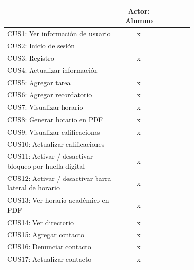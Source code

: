 \documentclass[10pt]{article}
\begin{document}
\begin{table}[ht]
    \begin{center}
        \begin{tabular}{|p{0.6\linewidth}|c |p{0.15\linewidth}|}
            \hline                                                   & Actor: Alumno \\ \hline
            {CUS1: Ver información de usuario}                       & x             \\ \hline
            {CUS2: Inicio de sesión}                                 &               \\ \hline
            {CUS3: Registro}                                         & x             \\ \hline
            {CUS4: Actualizar información}                           &               \\ \hline
            {CUS5: Agregar tarea}                                    & x             \\ \hline
            {CUS6: Agregar recordatorio}                             & x             \\ \hline
            {CUS7: Visualizar horario}                               & x             \\ \hline
            {CUS8: Generar horario en PDF}                           & x             \\ \hline
            {CUS9: Visualizar calificaciones}                        & x             \\ \hline
            {CUS10: Actualizar calificaciones}                       &               \\ \hline
            {CUS11: Activar / desactivar bloqueo por huella digital} & x             \\ \hline
            {CUS12: Activar / desactivar barra lateral de horario}   & x             \\ \hline
            {CUS13: Ver horario académico en PDF}                    & x             \\ \hline
            {CUS14: Ver directorio}                                  & x             \\ \hline
            {CUS15: Agregar contacto}                                & x             \\ \hline
            {CUS16:  Denunciar contacto}                             & x             \\ \hline
            {CUS17: Actualizar contacto}                             & x             \\ \hline

\end{tabular}
\end{center}
\end{table}
\end{document}
